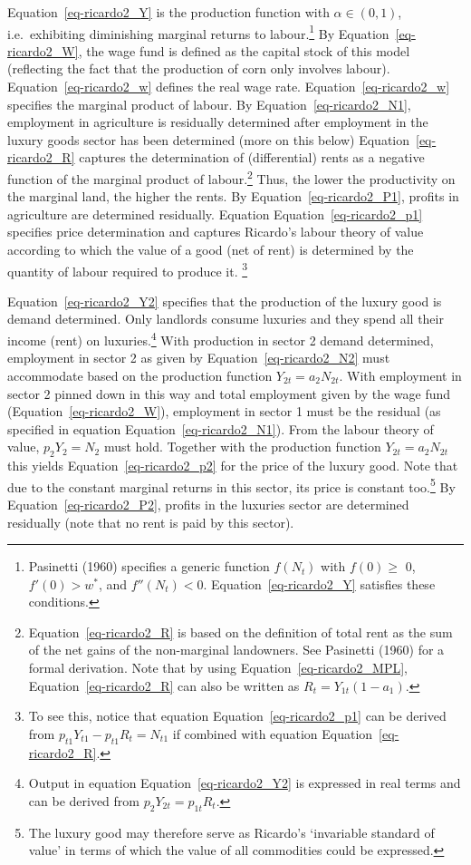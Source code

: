 \documentclass[
  letterpaper,
  DIV=11,
  numbers=noendperiod]{scrreprt}
\begin{document}
Equation~\ref{eq-ricardo2_Y} is the production function with
\(\alpha \in (0,1)\), i.e.~exhibiting diminishing marginal returns to
labour.\footnote{Pasinetti (1960) specifies a generic function
  \(f(N_t)\) with \(f(0) \geq\) 0, \(f'(0) > w^*\), and
  \(f''(N_t) < 0\). Equation~\ref{eq-ricardo2_Y} satisfies these
  conditions.} By Equation~\ref{eq-ricardo2_W}, the wage fund is defined
as the capital stock of this model (reflecting the fact that the
production of corn only involves labour). Equation~\ref{eq-ricardo2_w}
defines the real wage rate. Equation~\ref{eq-ricardo2_w} specifies the
marginal product of labour. By Equation~\ref{eq-ricardo2_N1}, employment
in agriculture is residually determined after employment in the luxury
goods sector has been determined (more on this below)
Equation~\ref{eq-ricardo2_R} captures the determination of
(differential) rents as a negative function of the marginal product of
labour.\footnote{Equation~\ref{eq-ricardo2_R} is based on the definition
  of total rent as the sum of the net gains of the non-marginal
  landowners. See Pasinetti (1960) for a formal derivation. Note that by
  using Equation~\ref{eq-ricardo2_MPL}, Equation~\ref{eq-ricardo2_R} can
  also be written as \(R_t = Y_{1t}(1-a_1)\).} Thus, the lower the
productivity on the marginal land, the higher the rents. By
Equation~\ref{eq-ricardo2_P1}, profits in agriculture are determined
residually. Equation Equation~\ref{eq-ricardo2_p1} specifies price
determination and captures Ricardo's labour theory of value according to
which the value of a good (net of rent) is determined by the quantity of
labour required to produce it. \footnote{To see this, notice that
  equation Equation~\ref{eq-ricardo2_p1} can be derived from
  \(p_{t1}Y_{t1}-p_{t1}R_{t}=N_{t1}\) if combined with equation
  Equation~\ref{eq-ricardo2_R}.}

Equation~\ref{eq-ricardo2_Y2} specifies that the production of the
luxury good is demand determined. Only landlords consume luxuries and
they spend all their income (rent) on luxuries.\footnote{Output in
  equation Equation~\ref{eq-ricardo2_Y2} is expressed in real terms and
  can be derived from \(p_{2}Y_{2t}=p_{1t}R_t\).} With production in
sector 2 demand determined, employment in sector 2 as given by
Equation~\ref{eq-ricardo2_N2} must accommodate based on the production
function \(Y_{2t}=a_2N_{2t}\). With employment in sector 2 pinned down
in this way and total employment given by the wage fund
(Equation~\ref{eq-ricardo2_W}), employment in sector 1 must be the
residual (as specified in equation Equation~\ref{eq-ricardo2_N1}). From
the labour theory of value, \(p_2Y_2=N_2\) must hold. Together with the
production function \(Y_{2t}=a_2N_{2t}\) this yields
Equation~\ref{eq-ricardo2_p2} for the price of the luxury good. Note
that due to the constant marginal returns in this sector, its price is
constant too.\footnote{The luxury good may therefore serve as Ricardo's
  `invariable standard of value' in terms of which the value of all
  commodities could be expressed.} By Equation~\ref{eq-ricardo2_P2},
profits in the luxuries sector are determined residually (note that no
rent is paid by this sector).
\end{document}
